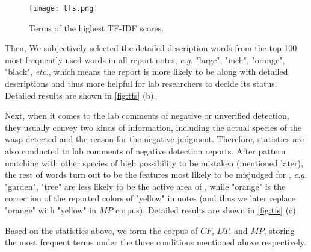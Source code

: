 \documentclass{mcmthesis}
\begin{document}
\begin{figure}[htbp]
    \centering
    \texttt{[image: tfs.png]}
    \caption{Terms of the highest TF-IDF scores.}
    \label{fig:tfs}
\end{figure}

Then, We subjectively selected the detailed description words from the top 100 most frequently used words in all report notes, \emph{e.g.} "large", "inch", "orange", "black", \emph{etc.}, which means the report is more likely to be along with detailed descriptions and thus more helpful for lab researchers to decide its status. Detailed results are shown in \autoref{fig:tfs} (b).

Next, when it comes to the lab comments of negative or unverified detection, they usually convey two kinds of information, including the actual species of the wasp detected and the reason for the negative judgment. Therefore, statistics are also conducted to lab comments of negative detection reports. After pattern matching with other species of high possibility to be mistaken (mentioned later), the rest of words turn out to be the features most likely to be misjudged for \VM, \emph{e.g.} "garden", "tree" are less likely to be the active area of \VM, while "orange" is the correction of the reported colors of "yellow" in notes (and thus we later replace "orange" with "yellow" in $MP$ corpus). Detailed results are shown in \autoref{fig:tfs} (c).


Based on the statistics above, we form the corpus of $CF$, $DT$, and $MP$, storing the most frequent terms under the three conditions mentioned above respectively.
\end{document}
